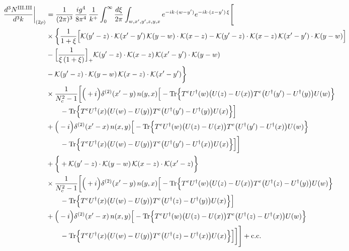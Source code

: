 \documentclass[9pt]{article}
\numberwithin{equation}{section}
\begin{document}
\begin{align}
\frac{d^{3}N^{\rm III.III}}{d^{3}k}\bigg|_{(2\rho)}&=\frac{1}{(2\pi)^{3}}\,\frac{ig^{4}}{8\pi^{4}}\,\frac{1}{k^{+}}\int_{0}^{\infty}\frac{d\xi}{2\pi}\int_{w,x',y',z,y,x}e^{-ik\cdot(w-y')}e^{-ik\cdot(z-y')\,\xi}\Bigg[\notag\\
&\times\bigg\{\frac{1}{1+\xi}\Big[\mathcal{K}(y'-z)\cdot\mathcal{K}(x'-y')\,\mathcal{K}(y-w)\cdot\mathcal{K}(x-z)-\mathcal{K}(y'-z)\cdot\mathcal{K}(x-z)\,\mathcal{K}(x'-y')\cdot\mathcal{K}(y-w)\Big]\notag\\
&-\Big[\frac{1}{\xi\,(1+\xi)}\Big]_{+}\mathcal{K}(y'-z)\cdot\mathcal{K}(x-z)\,\mathcal{K}(x'-y')\cdot\mathcal{K}(y-w)\notag\\
&-\mathcal{K}(y'-z)\cdot\mathcal{K}(y-w)\,\mathcal{K}(x-z)\cdot\mathcal{K}(x'-y')\bigg\}\notag\\
&\times \frac{1}{N_{c}^{2}-1}\bigg[\Big(+i\Big)\delta^{(2)}(x'-y)\,n(y,x)\Big[-{\rm Tr}\Big\{T^{e}U^{\dagger}(w)\big(U(z)-U(x)\big)T^{e}\big(U^{\dagger}(y')-U^{\dagger}(y)\big)U(w)\Big\}\notag\\&\qquad-{\rm Tr}\Big\{T^{e}U^{\dagger}(x)\big(U(w)-U(y)\big)T^{e}\big(U^{\dagger}(y')-U^{\dagger}(y)\big)U(x)\Big\}\Big]\notag\\
& +\Big(-i\Big)\delta^{(2)}(x'-x)\,n(x,y)\Big[-{\rm Tr}\Big\{T^{e}U^{\dagger}(w)\big(U(z)-U(x)\big)T^{e}\big(U^{\dagger}(y')-U^{\dagger}(x)\big)U(w)\Big\}\notag\\&\qquad-{\rm Tr}\Big\{T^{e}U^{\dagger}(x)\big(U(w)-U(y)\big)T^{e}\big(U^{\dagger}(y')-U^{\dagger}(x)\big)U(x)\Big\}\Big]\bigg]\notag\\
&+\bigg\{+\mathcal{K}(y'-z)\cdot\mathcal{K}(y-w)\,\mathcal{K}(x-z)\cdot\mathcal{K}(x'-z)\bigg\}\notag\\
&\times \frac{1}{N_{c}^{2}-1}\bigg[\Big(+i\Big)\delta^{(2)}(x'-y)\,n(y,x)\Big[-{\rm Tr}\Big\{T^{e}U^{\dagger}(w)\big(U(z)-U(x)\big)T^{e}\big(U^{\dagger}(z)-U^{\dagger}(y)\big)U(w)\Big\}\notag\\&\qquad-{\rm Tr}\Big\{T^{e}U^{\dagger}(x)\big(U(w)-U(y)\big)T^{e}\big(U^{\dagger}(z)-U^{\dagger}(y)\big)U(x)\Big\}\Big]\notag\\
& +\Big(-i\Big)\delta^{(2)}(x'-x)\,n(x,y)\Big[-{\rm Tr}\Big\{T^{e}U^{\dagger}(w)\big(U(z)-U(x)\big)T^{e}\big(U^{\dagger}(z)-U^{\dagger}(x)\big)U(w)\Big\}\notag\\&\qquad-{\rm Tr}\Big\{T^{e}U^{\dagger}(x)\big(U(w)-U(y)\big)T^{e}\big(U^{\dagger}(z)-U^{\dagger}(x)\big)U(x)\Big\}\Big]\bigg]\Bigg]+{\rm c.c.}\label{eq:S-III.III-2}
\end{align}
\end{document}
